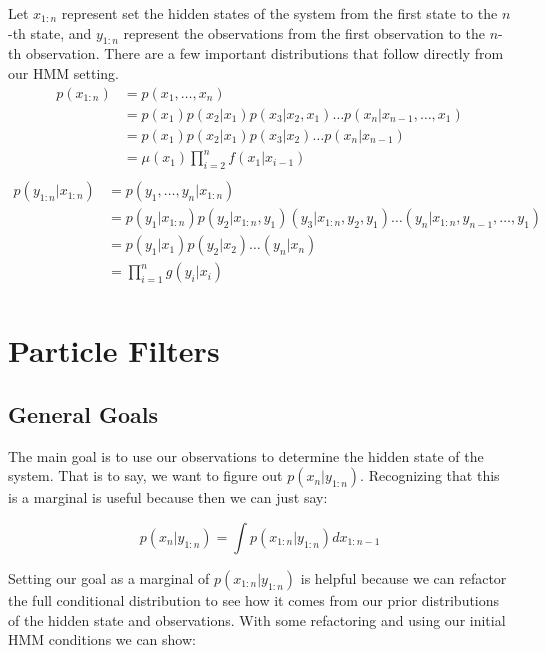 \documentclass{article}
\begin{document}
Let $x_{1:n}$ represent set the hidden states of the system from the first state to the $n$-th state, and $y_{1:n}$ represent the observations from the first observation to the $n$-th observation. There are a few important distributions that follow directly from our HMM setting.
\begin{equation}
\begin{split}
p(x_{1:n}) &= p(x_1,\dots,x_n)\\
&= p(x_1)p(x_2|x_1)p(x_3|x_2,x_1)\dots p(x_n|x_{n-1},\dots,x_1)\\
&= p(x_1)p(x_2|x_1)p(x_3|x_2)\dots p(x_n|x_{n-1})\\
&=\mu(x_1)\prod_{i=2}^{n} f(x_1|x_{i-1})\\
\end{split}
\end{equation}
\begin{equation}
\begin{split}
p(y_{1:n}|x_{1:n}) &= p(y_1,\dots,y_n|x_{1:n})\\
&= p(y_1|x_{1:n})p(y_2|x_{1:n},y_1)(y_3|x_{1:n},y_2,y_1)\dots (y_n|x_{1:n},y_{n-1},\dots,y_1)\\
&= p(y_1|x_1)p(y_2|x_2)\dots (y_n|x_n)\\
&= \prod_{i=1}^{n} g(y_i|x_i)\\
\end{split}
\end{equation}



\section{Particle Filters}
\subsection{General Goals}

The main goal is to use our observations to determine the hidden state of the system. That is to say, we want to figure out $p(x_{n}|y_{1:n})$. Recognizing that this is a marginal is useful because then we can just say:

\begin{equation}
p(x_{n}|y_{1:n}) = \int p(x_{1:n}|y_{1:n}) dx_{1:n-1}
\end{equation}

Setting our goal as a marginal of $p(x_{1:n}|y_{1:n})$ is helpful because we can refactor the full conditional distribution to see how it comes from our prior distributions of the hidden state and observations. With some refactoring and using our initial HMM conditions we can show:
\end{document}
